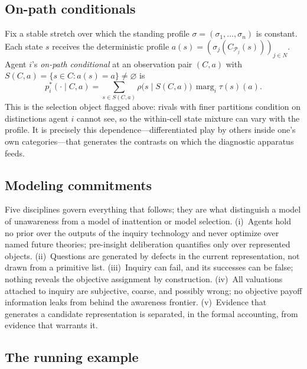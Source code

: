 \documentclass[11pt]{article}
\theoremstyle{definition}
\newcommand{\emptysetset}{\varnothing}
\newcommand{\marg}[1]{\operatorname{marg}_{#1}}
\begin{document}
\subsection{On-path conditionals}

Fix a stable stretch over which the standing profile $\sigma=(\sigma_1,\dots,\sigma_n)$ is constant.
Each state $s$ receives the deterministic profile $a(s)=(\sigma_j(C_{\mathcal P_j}(s)))_{j\in N}$.
Agent $i$'s \emph{on-path conditional} at an observation pair $(C,a)$ with $S(C,a)=\{s\in C:a(s)=a\}\neq\emptysetset$ is
\begin{equation}
p_i^{*}(\cdot\mid C,a)
=
\sum_{s\in S(C,a)}\rho\bigl(s\mid S(C,a)\bigr)\,\marg{i}\tau(s)(a).
\label{eq:onpath-conditional}
\end{equation}
This is the selection object flagged above: rivals with finer partitions condition on distinctions agent $i$ cannot see, so the within-cell state mixture can vary with the profile.
It is precisely this dependence---differentiated play by others inside one's own categories---that generates the contrasts on which the diagnostic apparatus feeds.

\subsection{Modeling commitments}
\label{sec:commitments}

Five disciplines govern everything that follows; they are what distinguish a model of unawareness from a model of inattention or model selection.
(i)~Agents hold no prior over the outputs of the inquiry technology and never optimize over named future theories; pre-insight deliberation quantifies only over represented objects.
(ii)~Questions are generated by defects in the current representation, not drawn from a primitive list.
(iii)~Inquiry can fail, and its successes can be false; nothing reveals the objective assignment by construction.
(iv)~All valuations attached to inquiry are subjective, coarse, and possibly wrong; no objective payoff information leaks from behind the awareness frontier.
(v)~Evidence that generates a candidate representation is separated, in the formal accounting, from evidence that warrants it.

\subsection{The running example}
\end{document}
